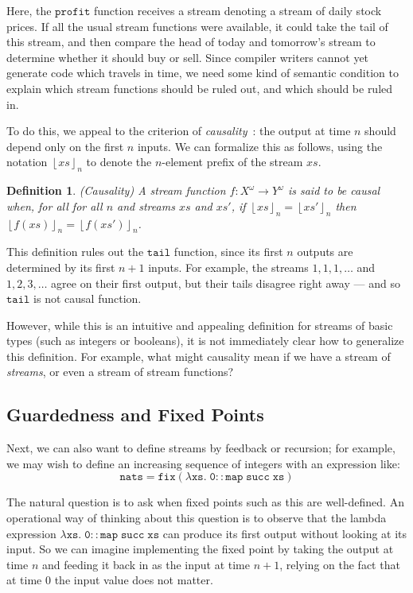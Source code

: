 \documentclass[preprint]{sigplanconf}
\newcommand{\term}[1]{\ensuremath{\mathtt{{#1}}}}
\newcommand{\floor}[1]{\left\lfloor{#1}\right\rfloor}
\newtheorem{definition}{Definition}
\begin{document}
Here, the \term{profit} function receives a stream denoting a stream
of daily stock prices. If all the usual stream functions were
available, it could take the tail of this stream, and then compare the
head of today and tomorrow's stream to determine whether it should buy
or sell. Since compiler writers cannot yet generate code which travels
in time, we need some kind of semantic condition to explain which
stream functions should be ruled out, and which should be ruled in.

To do this, we appeal to the criterion of \emph{causality}~\cite{causality}: 
the output at time $n$ should depend only on the first $n$ inputs. We can
formalize this as follows, using the notation $\floor{xs}_n$ to denote the 
$n$-element prefix of the stream $xs$. 

\begin{definition}{(Causality)}
A stream function $f : X^\omega \to Y^\omega$ is said to be \emph{causal} when,
for all for all $n$ and streams $xs$ and $xs'$, if $\floor{xs}_n = \floor{xs'}_n$
then $\floor{f(xs)}_n = \floor{f(xs')}_n$.   
\end{definition}

This definition rules out the \term{tail} function, since its first
$n$ outputs are determined by its first $n+1$ inputs. For example, the
streams $1, 1, 1, \ldots$ and $1, 2, 3, \ldots$ agree on their first
output, but their tails disagree right away --- and so \term{tail} is
not causal function.

However, while this is an intuitive and appealing definition for
streams of basic types (such as integers or booleans), it is not
immediately clear how to generalize this definition. For example, what
might causality mean if we have a stream of \emph{streams}, or even a
stream of stream functions? 

\subsection{Guardedness and Fixed Points}

Next, we can also want to define streams by feedback or recursion; for
example, we may wish to define an increasing sequence of integers with
an expression like:
\begin{displaymath}
\term{nats = fix(\lambda xs.\; 0 :: map\;succ\;xs)}  
\end{displaymath}
  
The natural question is to ask when fixed points such as this are
well-defined. An operational way of thinking about this question is to
observe that the lambda expression \term{\lambda xs.\; 0 :: map\;succ\;xs} 
can produce its first output without looking at its input. So we can 
imagine implementing the fixed point by taking the output at time $n$ and 
feeding it back in as the input at time $n+1$, relying on the fact that at 
time 0 the input value does not matter.
\end{document}
